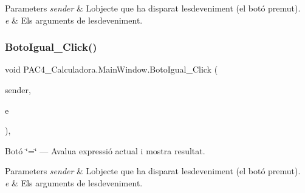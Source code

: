 \begin{DoxyParams}{Parameters}
{\em sender} & L\textquotesingle{}objecte que ha disparat l\textquotesingle{}esdeveniment (el botó premut).\\
\hline
{\em e} & Els arguments de l\textquotesingle{}esdeveniment.\\
\hline
\end{DoxyParams}
\mbox{\label{class_p_a_c4___calculadora_1_1_main_window_a4c90e856d7eeed3dc7566065be69e24c}} 
\subsubsection{\texorpdfstring{Boto\+Igual\+\_\+\+Click()}{BotoIgual\_Click()}}
{\footnotesize\ttfamily void P\+A\+C4\+\_\+\+Calculadora.\+Main\+Window.\+Boto\+Igual\+\_\+\+Click (\begin{DoxyParamCaption}\item[{object}]{sender,  }\item[{Routed\+Event\+Args}]{e }\end{DoxyParamCaption})\hspace{0.3cm}{\ttfamily [inline]}, {\ttfamily [private]}}



Botó \char`\"{}=\char`\"{} — Avalua expressió actual i mostra resultat. 


\begin{DoxyParams}{Parameters}
{\em sender} & L\textquotesingle{}objecte que ha disparat l\textquotesingle{}esdeveniment (el botó premut).\\
\hline
{\em e} & Els arguments de l\textquotesingle{}esdeveniment.\\
\hline
\end{DoxyParams}
\mbox{\label{class_p_a_c4___calculadora_1_1_main_window_a0e517e85785a6d5c4416c1799ff83f74}} 
